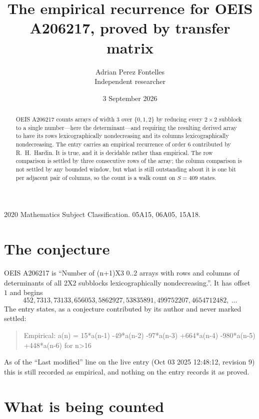 \documentclass[11pt,a4paper]{article}
\title{The empirical recurrence for OEIS A206217, proved by transfer matrix}
\author{Adrian Perez Fontelles\\ \small Independent researcher}
\date{3 September 2026}
\theoremstyle{plain}
\theoremstyle{definition}
\begin{document}
\maketitle

\begin{abstract}
OEIS A206217 counts arrays of width $3$ over $\{0,1,2\}$ by reducing every $2\times2$ subblock to a
single number---here the determinant---and requiring the resulting derived array to have its rows
lexicographically nondecreasing and its columns lexicographically nondecreasing. The entry carries an
empirical recurrence of order $6$ contributed by R.~H.~Hardin. It is true, and it is
decidable rather than empirical. The row comparison is settled by three consecutive rows of the
array; the column comparison is not settled by any bounded window, but what is still outstanding
about it is one bit per adjacent pair of columns, so the count is a walk count on $S=409$
states.
\end{abstract}

\noindent\small 2020 Mathematics Subject Classification. 05A15, 06A05, 15A18.\normalsize

\section{The conjecture}

OEIS A206217 is ``Number of (n+1)X3 0..2 arrays with rows and columns of determinants of all 2X2 subblocks lexicographically nondecreasing.''. It has offset $1$ and begins
\[
452, 7313, 73133, 656053, 5862927, 53835891, 499752207, 4654712482,\ \dots
\]
The entry states, as a conjecture contributed by its author and never marked settled:
\begin{quote}
Empirical: a(n) = 15*a(n-1) -49*a(n-2) -97*a(n-3) +664*a(n-4) -980*a(n-5) +448*a(n-6) for n>16
\end{quote}
As of the ``Last modified'' line on the live entry (Oct 03 2025 12:48:12, revision 9) this is still
recorded as empirical, and nothing on the entry records it as proved.

\section{What is being counted}
\end{document}
